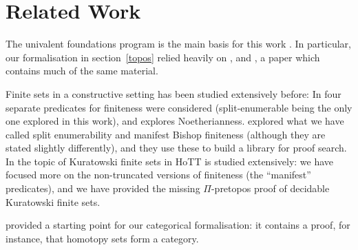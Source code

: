 \section{Related Work}
The univalent foundations program is the main basis for this work
\cite{hottbook}.
In particular, our formalisation in section~\ref{topos} relied heavily on
\cite[chapter 10]{hottbook}, and \cite{rijkeSetsHomotopyType2015}, a paper which
contains much of the same material.

Finite sets in a constructive setting has been studied extensively before:
In \cite{coquandConstructivelyFinite2010} four separate predicates for
finiteness were considered (split-enumerable being the only one explored in this
work), and \cite{firsovVariationsNoetherianness2016} explores Noetherianness.
\cite{firsovDependentlyTypedProgramming2015} explored what we have called split
enumerability and manifest Bishop finiteness (although they are stated slightly
differently), and they use these to build a library for proof search.
In \cite{fruminFiniteSetsHomotopy2018} the topic of Kuratowski finite sets in
HoTT is studied extensively: we have focused more on the non-truncated versions
of finiteness (the ``manifest'' predicates), and we have provided the missing
\(\Pi\)-pretopos proof of decidable Kuratowski finite sets.

\cite{iversenUnivalentCategoriesFormalization2018} provided a starting point for
our categorical formalisation: it contains a proof, for instance, that homotopy
sets form a category.


